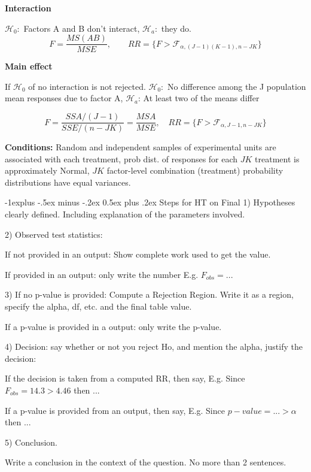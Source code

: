 \documentclass[8pt,landscape]{extarticle}
\makeatletter
\renewcommand{\subsection}{\@startsection{subsection}{2}{0mm}%
                                {-1explus -.5ex minus -.2ex}%
                                {0.5ex plus .2ex}%
                                {\normalfont\normalsize\bfseries}}
\makeatother
\begin{document}
\begin{multicols}{3}
\begin{tabular}{lcccc}
\end{tabular}

\textbf{Interaction}

$\mathcal{H}_0 :$ Factors A and B don't interact, $\mathcal{H}_a :$ they do.
$$F = \frac{MS(AB)}{ MSE}, \quad \quad RR = \{ F > \mathcal{F}_{\alpha, (J-1)(K-1), n-JK} \} $$

\textbf{Main effect}

If $\mathcal{H}_0$ of no interaction is not rejected. $\mathcal{H}_0 :$ No difference among the J population mean responses due to factor A, 
$\mathcal{H}_a$: At least two of the means differ

$$F = \frac{SSA/(J-1) }{SSE/(n-JK)} = \frac{MSA}{MSE}, \quad RR = \{ F > \mathcal{F}_{\alpha ,J-1, n-JK }\} $$

\textbf{Conditions:} Random and independent samples of experimental units are associated with each treatment, prob dist. of responses for each $JK$ treatment is approximately Normal, $JK$ factor-level combination (treatment) probability distributions have equal variances.

\subsection{Steps for HT on Final}
1) Hypotheses clearly defined. Including explanation of the parameters involved. 

2) Observed test statistics: 

If not provided in an output: Show complete work used to get the value.

If provided in an output: only write the number E.g. $F_{obs}=...$

3) If no p-value is provided: Compute a Rejection Region.
Write it as a region, specify the alpha, df, etc. and the final table value.

If a p-value is provided in a output: only write the p-value.

4) Decision: say whether or not you reject Ho, and mention the alpha, justify the decision:

If the decision is taken from a computed RR, then say, E.g. Since $F_{obs}=14.3 > 4.46$ then ...

If a p-value is provided from an output, then say, E.g. Since $p-value=...>\alpha$ then ... 

5) Conclusion. 

Write a conclusion in the context of the question. No more than 2 sentences. 



\end{multicols}
\end{document}
